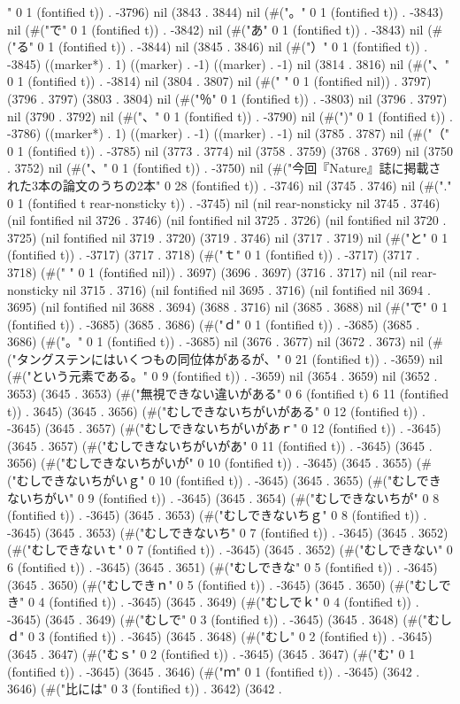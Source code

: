 " 0 1 (fontified t)) . -3796) nil (3843 . 3844) nil (#("。" 0 1 (fontified t)) . -3843) nil (#("で" 0 1 (fontified t)) . -3842) nil (#("あ" 0 1 (fontified t)) . -3843) nil (#("る" 0 1 (fontified t)) . -3844) nil (3845 . 3846) nil (#("）" 0 1 (fontified t)) . -3845) ((marker*) . 1) ((marker) . -1) ((marker) . -1) nil (3814 . 3816) nil (#("、" 0 1 (fontified t)) . -3814) nil (3804 . 3807) nil (#(" " 0 1 (fontified nil)) . 3797) (3796 . 3797) (3803 . 3804) nil (#("％" 0 1 (fontified t)) . -3803) nil (3796 . 3797) nil (3790 . 3792) nil (#("、" 0 1 (fontified t)) . -3790) nil (#(")" 0 1 (fontified t)) . -3786) ((marker*) . 1) ((marker) . -1) ((marker) . -1) nil (3785 . 3787) nil (#("（" 0 1 (fontified t)) . -3785) nil (3773 . 3774) nil (3758 . 3759) (3768 . 3769) nil (3750 . 3752) nil (#("、" 0 1 (fontified t)) . -3750) nil (#("今回『Nature』誌に掲載された3本の論文のうちの2本" 0 28 (fontified t)) . -3746) nil (3745 . 3746) nil (#("." 0 1 (fontified t rear-nonsticky t)) . -3745) nil (nil rear-nonsticky nil 3745 . 3746) (nil fontified nil 3726 . 3746) (nil fontified nil 3725 . 3726) (nil fontified nil 3720 . 3725) (nil fontified nil 3719 . 3720) (3719 . 3746) nil (3717 . 3719) nil (#("と" 0 1 (fontified t)) . -3717) (3717 . 3718) (#("ｔ" 0 1 (fontified t)) . -3717) (3717 . 3718) (#(" " 0 1 (fontified nil)) . 3697) (3696 . 3697) (3716 . 3717) nil (nil rear-nonsticky nil 3715 . 3716) (nil fontified nil 3695 . 3716) (nil fontified nil 3694 . 3695) (nil fontified nil 3688 . 3694) (3688 . 3716) nil (3685 . 3688) nil (#("で" 0 1 (fontified t)) . -3685) (3685 . 3686) (#("ｄ" 0 1 (fontified t)) . -3685) (3685 . 3686) (#("。" 0 1 (fontified t)) . -3685) nil (3676 . 3677) nil (3672 . 3673) nil (#("タングステンにはいくつもの同位体があるが、" 0 21 (fontified t)) . -3659) nil (#("という元素である。" 0 9 (fontified t)) . -3659) nil (3654 . 3659) nil (3652 . 3653) (3645 . 3653) (#("無視できない違いがある" 0 6 (fontified t) 6 11 (fontified t)) . 3645) (3645 . 3656) (#("むしできないちがいがある" 0 12 (fontified t)) . -3645) (3645 . 3657) (#("むしできないちがいがあｒ" 0 12 (fontified t)) . -3645) (3645 . 3657) (#("むしできないちがいがあ" 0 11 (fontified t)) . -3645) (3645 . 3656) (#("むしできないちがいが" 0 10 (fontified t)) . -3645) (3645 . 3655) (#("むしできないちがいｇ" 0 10 (fontified t)) . -3645) (3645 . 3655) (#("むしできないちがい" 0 9 (fontified t)) . -3645) (3645 . 3654) (#("むしできないちが" 0 8 (fontified t)) . -3645) (3645 . 3653) (#("むしできないちｇ" 0 8 (fontified t)) . -3645) (3645 . 3653) (#("むしできないち" 0 7 (fontified t)) . -3645) (3645 . 3652) (#("むしできないｔ" 0 7 (fontified t)) . -3645) (3645 . 3652) (#("むしできない" 0 6 (fontified t)) . -3645) (3645 . 3651) (#("むしできな" 0 5 (fontified t)) . -3645) (3645 . 3650) (#("むしできｎ" 0 5 (fontified t)) . -3645) (3645 . 3650) (#("むしでき" 0 4 (fontified t)) . -3645) (3645 . 3649) (#("むしでｋ" 0 4 (fontified t)) . -3645) (3645 . 3649) (#("むしで" 0 3 (fontified t)) . -3645) (3645 . 3648) (#("むしｄ" 0 3 (fontified t)) . -3645) (3645 . 3648) (#("むし" 0 2 (fontified t)) . -3645) (3645 . 3647) (#("むｓ" 0 2 (fontified t)) . -3645) (3645 . 3647) (#("む" 0 1 (fontified t)) . -3645) (3645 . 3646) (#("ｍ" 0 1 (fontified t)) . -3645) (3642 . 3646) (#("比には" 0 3 (fontified t)) . 3642) (3642 . 